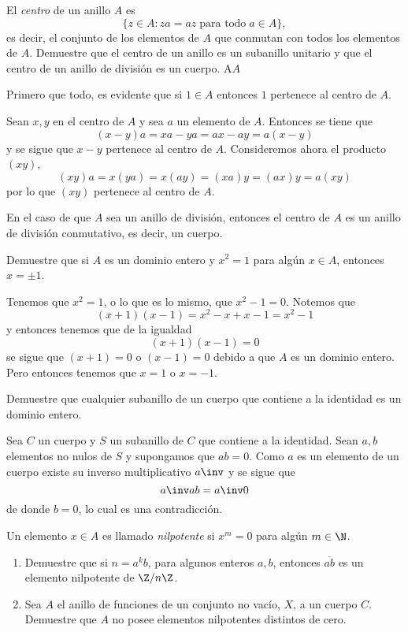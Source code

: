 \begin{ejer} 
		El \textit{centro} de un anillo $A$ es 
		\[\{z \in A: za=az \; \text{para todo} \;  a \in A \},\]
		es decir, el conjunto de los elementos de $A$ que conmutan con todos los elementos de $A$. Demuestre que el centro de un anillo es un subanillo unitario y que el centro de un anillo de división es un cuerpo. A$A$
\end{ejer} 
\begin{sol}
	Primero que todo, es evidente que si $1 \in A$ entonces $1$ pertenece al centro de $A$.
	
	Sean $x,y$ en el centro de $A$ y sea $a$ un elemento de $A$. Entonces se tiene que
	\[ (x-y)a = xa-ya = ax - ay = a(x-y) \]
	y se sigue que $x-y$ pertenece al centro de $A$.
	Consideremos ahora el producto $(xy)$,
	\[ (xy)a = x(ya) = x(ay) = (xa)y = (ax)y = a(xy) \]
	por lo que $(xy)$ pertenece al centro de $A$.
	
	En el caso de que $A$ sea un anillo de división, entonces el centro de $A$ es un anillo de división conmutativo, es decir, un cuerpo.
\end{sol}
\begin{ejer} 
		Demuestre que si $A$ es un dominio entero y $x^2 = 1$ para algún $x \in A$, entonces $x = \pm 1$.
\end{ejer} 
\begin{sol}
	Tenemos que $x^2=1$, o lo que es lo mismo, que $x^2 - 1 = 0$. Notemos que 
	\[ (x+1)(x-1) = x^2 - x + x -1 = x^2 -1 \]
	y entonces tenemos que de la igualdad 
	\[ (x+1)(x-1) = 0 \]
	se sigue que $(x+1) = 0$ o $(x-1) = 0$ debido a que $A$ es un dominio entero. Pero entonces tenemos que $x=1$ o $x=-1$.
\end{sol}
\begin{ejer} 
		Demuestre que cualquier subanillo de un cuerpo que contiene a la identidad es un dominio entero.
\end{ejer} 
\begin{sol}
	Sea $C$ un cuerpo y $S$ un subanillo de $C$ que contiene a la identidad. Sean $a,b$ elementos no nulos de $S$ y supongamos que $ab=0$. Como $a$ es un elemento de un cuerpo existe su inverso multiplicativo $a\inv$ y se sigue que
	\[ a\inv ab = a\inv 0 \]
	de donde $b=0$, lo cual es una contradicción.
\end{sol}
\begin{ejer}\label{ejerNilpo} 
		Un elemento $x \in A$ es llamado \textit{nilpotente} si $x^m=0$ para algún $m \in \N$.
		\begin{enumerate}
			\item Demuestre que si $n=a^kb$, para algunos enteros $a,b$, entonces $\overline{ab}$ es un elemento nilpotente de $\Z/n\Z$.
			\item Sea $A$ el anillo de funciones de un conjunto no vacío, $X$, a un cuerpo $C$. Demuestre que $A$ no posee elementos nilpotentes distintos de cero.
		\end{enumerate}
\end{ejer} 
